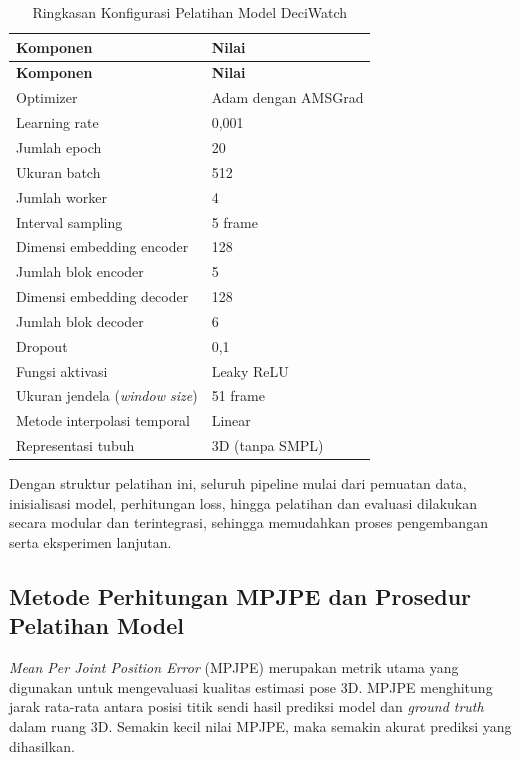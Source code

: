 \begin{longtable}{|p{5cm}|p{8cm}|}
    \caption{Ringkasan Konfigurasi Pelatihan Model DeciWatch} \label{tab:konfigurasi_pelatihan} \\
    \hline
    \textbf{Komponen} & \textbf{Nilai} \\
    \hline
    \endfirsthead

    \hline
    \textbf{Komponen} & \textbf{Nilai} \\
    \hline
    \endhead

    Optimizer & Adam dengan AMSGrad \\
    \hline
    Learning rate & 0{,}001 \\
    \hline
    Jumlah epoch & 20 \\
    \hline
    Ukuran batch & 512 \\
    \hline
    Jumlah worker & 4 \\
    \hline
    Interval sampling & 5 frame \\
    \hline
    Dimensi embedding encoder & 128 \\
    \hline
    Jumlah blok encoder & 5 \\
    \hline
    Dimensi embedding decoder & 128 \\
    \hline
    Jumlah blok decoder & 6 \\
    \hline
    Dropout & 0{,}1 \\
    \hline
    Fungsi aktivasi & Leaky ReLU \\
    \hline
    Ukuran jendela (\textit{window size}) & 51 frame \\
    \hline
    Metode interpolasi temporal & Linear \\
    \hline
    Representasi tubuh & 3D (tanpa SMPL) \\
    \hline
\end{longtable}

Dengan struktur pelatihan ini, seluruh pipeline mulai dari pemuatan data, inisialisasi model, perhitungan loss, hingga pelatihan dan evaluasi dilakukan secara modular dan terintegrasi, sehingga memudahkan proses pengembangan serta eksperimen lanjutan.

\subsection{Metode Perhitungan MPJPE dan Prosedur Pelatihan Model}
\textit{Mean Per Joint Position Error} (MPJPE) merupakan metrik utama yang digunakan untuk mengevaluasi kualitas estimasi pose 3D. MPJPE menghitung jarak rata-rata antara posisi titik sendi hasil prediksi model dan \textit{ground truth} dalam ruang 3D. Semakin kecil nilai MPJPE, maka semakin akurat prediksi yang dihasilkan.

